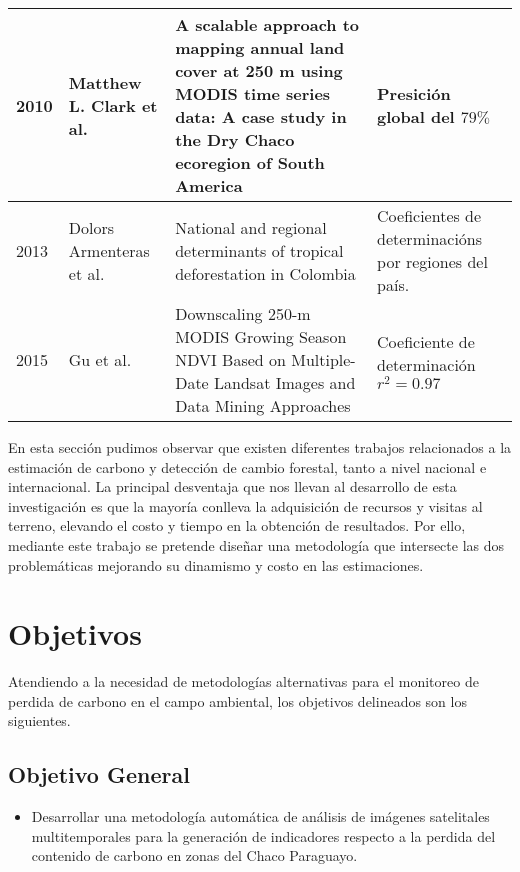 \begin{longtable}{|p{3cm}|p{3cm}|p{3cm}|p{3cm}|}
		2010          & Matthew L. Clark et al.                                & A scalable approach to mapping annual land cover at 250 m using MODIS time series data: A case study in the Dry Chaco ecoregion of South America                       & Presici\'on global del $79\%$                                                             \\ \hline
		2013          & Dolors Armenteras et al.                               & National and regional determinants of tropical deforestation in Colombia                                                                                               & Coeficientes de determinaci\'ons por regiones del pa\'is.                                 \\ \hline
		2015          & Gu et al.                                         & Downscaling 250-m MODIS Growing Season NDVI Based on Multiple-Date Landsat Images and Data Mining Approaches                                                           & Coeficiente de determinaci\'on $ r^{2}=0.97 $                                             \\ \hline		 

	\end{longtable}


En esta secci\'on pudimos observar que existen diferentes trabajos relacionados a la estimaci\'on de carbono y detecci\'on de cambio forestal, tanto a nivel nacional e internacional. La principal desventaja que nos llevan al desarrollo de esta investigaci\'on es que la mayor\'ia conlleva la adquisici\'on de recursos y visitas al terreno, elevando el costo y tiempo en la obtenci\'on de resultados. Por ello, mediante este trabajo se pretende dise\~{n}ar una metodolog\'ia que intersecte las dos problem\'aticas mejorando su dinamismo y costo en las estimaciones.

\section{Objetivos}
Atendiendo a la necesidad de metodolog\'ias alternativas para el monitoreo de perdida de carbono en el campo ambiental, los objetivos delineados son los siguientes.

\subsection{Objetivo General}

\begin{itemize}
\item Desarrollar una metodolog\'ia autom\'atica de an\'alisis de im\'agenes satelitales multitemporales para la generaci\'on de indicadores respecto a la perdida del contenido de carbono en zonas del Chaco Paraguayo.
\end{itemize}
